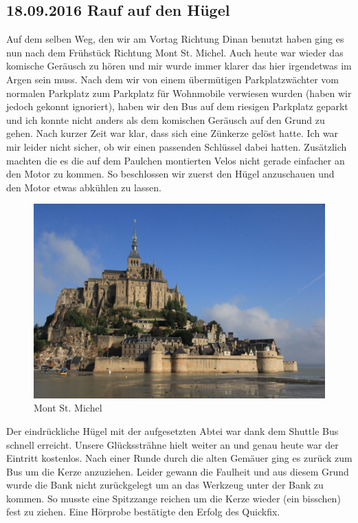 \subsection{18.09.2016 Rauf auf den Hügel}
Auf dem selben Weg, den wir am Vortag Richtung Dinan benutzt haben ging es nun nach dem Frühstück Richtung Mont St. Michel.
Auch heute war wieder das komische Geräusch zu hören und mir wurde immer klarer das hier irgendetwas im Argen sein muss.
Nach dem wir von einem übermütigen Parkplatzwächter vom normalen Parkplatz zum Parkplatz für Wohnmobile verwiesen wurden (haben wir jedoch gekonnt ignoriert), haben wir den Bus auf dem riesigen Parkplatz geparkt und ich konnte nicht anders als dem komischen Geräusch auf den Grund zu gehen.
Nach kurzer Zeit war klar, dass sich eine Zünkerze gelöst hatte.
Ich war mir leider nicht sicher, ob wir einen passenden Schlüssel dabei hatten.
Zusätzlich machten die es die auf dem Paulchen montierten Velos nicht gerade einfacher an den Motor zu kommen.
So beschlossen wir zuerst den Hügel anzuschauen und den Motor etwas abkühlen zu lassen.

\begin{figure}[H]
    \centering
    \includegraphics[width=\textwidth]{../Bilder/Bretagne/168.jpg}
    \caption{Mont St. Michel}
    \label{img:Mont St. Michel}
\end{figure}

Der eindrückliche Hügel mit der aufgesetzten Abtei war dank dem Shuttle Bus schnell erreicht.
Unsere Glückssträhne hielt weiter an und genau heute war der Eintritt kostenlos.
Nach einer Runde durch die alten Gemäuer ging es zurück zum Bus um die Kerze anzuziehen.
Leider gewann die Faulheit und aus diesem Grund wurde die Bank nicht zurückgelegt um an das Werkzeug unter der Bank zu kommen.
So musste eine Spitzzange reichen um die Kerze wieder (ein bisschen) fest zu ziehen.
Eine Hörprobe bestätigte den Erfolg des Quickfix.

